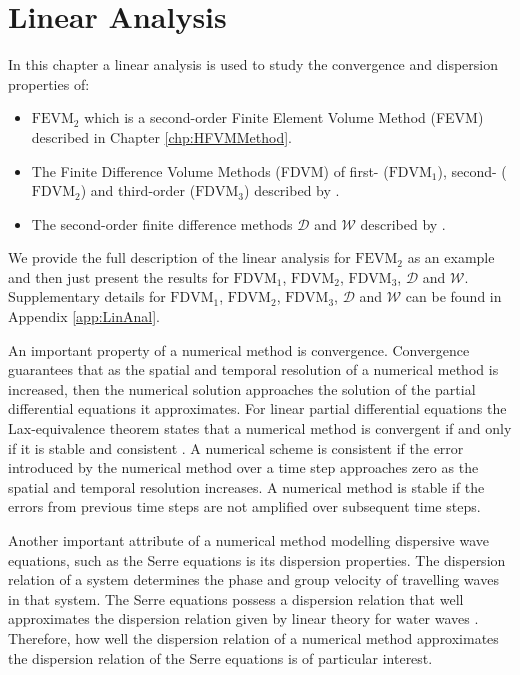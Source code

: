 \chapter{Linear Analysis}
\label{chp:AnalNumMethod}
In this chapter a linear analysis is used to study the convergence and dispersion properties of:
\begin{itemize}
	\item $\text{FEVM}_2$ which is a second-order Finite Element Volume Method (FEVM) described in Chapter \ref{chp:HFVMMethod}.
	\item The Finite Difference Volume Methods (FDVM) of first- ($\text{FDVM}_1$), second- ($\text{FDVM}_2$) and third-order ($\text{FDVM}_3$) described by \citet{Zoppou-etal-2017}.
	\item The second-order finite difference methods $\mathcal{D}$ and $\mathcal{W}$ described by \citet{Pitt-2018-61}.
\end{itemize}
 We provide the full description of the linear analysis for $\text{FEVM}_2$ as an example and then just present the results for $\text{FDVM}_1$, $\text{FDVM}_2$, $\text{FDVM}_3$, $\mathcal{D}$ and $\mathcal{W}$. Supplementary details for $\text{FDVM}_1$, $\text{FDVM}_2$, $\text{FDVM}_3$, $\mathcal{D}$ and $\mathcal{W}$ can be found in Appendix \ref{app:LinAnal}. 


An important property of a numerical method is convergence. Convergence guarantees that as the spatial and temporal resolution of a numerical method is increased, then the numerical solution approaches the solution of the partial differential equations it approximates. For linear partial differential equations the Lax-equivalence theorem states that a numerical method is convergent if and only if it is stable and consistent \cite{Lax-Richtmyer-1956-267}. A numerical scheme is consistent if the error introduced by the numerical method over a time step approaches zero as the spatial and temporal resolution increases. A numerical method is stable if the errors from previous time steps are not amplified over subsequent time steps.

Another important attribute of a numerical method modelling dispersive wave equations, such as the Serre equations is its dispersion properties. The dispersion relation of a system determines the phase and group velocity of travelling waves in that system. The Serre equations possess a dispersion relation that well approximates the dispersion relation given by linear theory for water waves \cite{Barthelemy-2004-315}. Therefore, how well the dispersion relation of a numerical method approximates the dispersion relation of the Serre equations is of particular interest.

